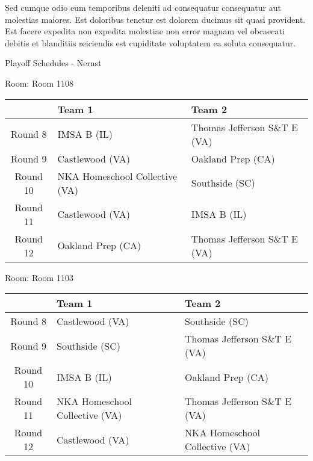 \documentclass{article}%
\begin{document}
\newline%
Sed cumque odio eum temporibus deleniti ad consequatur consequatur aut molestias maiores. Est doloribus tenetur est dolorem ducimus sit quasi provident. Est facere expedita non expedita molestiae non error magnam vel obcaecati debitis et blanditiis reiciendis est cupiditate voluptatem ea soluta consequatur.%
\newpage%
\begin{center}%
\begin{Huge}%
Playoff Schedules {-} Nernst%
\end{Huge}%
\end{center}%
\begin{flushleft}%
\begin{Large}%
Room: Room 1108%
\end{Large}%
\end{flushleft}%
\begin{tabularx}{\textwidth}{|c|Y|Y|}%
\hline%
&Team 1&Team 2\\%
\hline%
Round 8&IMSA B (IL)&Thomas Jefferson S\&T E (VA)\\%
Round 9&Castlewood (VA)&Oakland Prep (CA)\\%
Round 10&NKA Homeschool Collective (VA)&Southside (SC)\\%
Round 11&Castlewood (VA)&IMSA B (IL)\\%
Round 12&Oakland Prep (CA)&Thomas Jefferson S\&T E (VA)\\%
\hline%
\end{tabularx}%
\vspace*{8pt}%
\linebreak%
\begin{flushleft}%
\begin{Large}%
Room: Room 1103%
\end{Large}%
\end{flushleft}%
\begin{tabularx}{\textwidth}{|c|Y|Y|}%
\hline%
&Team 1&Team 2\\%
\hline%
Round 8&Castlewood (VA)&Southside (SC)\\%
Round 9&Southside (SC)&Thomas Jefferson S\&T E (VA)\\%
Round 10&IMSA B (IL)&Oakland Prep (CA)\\%
Round 11&NKA Homeschool Collective (VA)&Thomas Jefferson S\&T E (VA)\\%
Round 12&Castlewood (VA)&NKA Homeschool Collective (VA)\\%
\hline%
\end{tabularx}%
\vspace*{8pt}%
\end{document}
